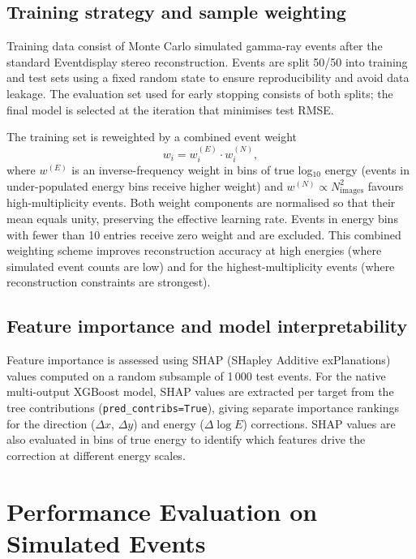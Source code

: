 \documentclass[12pt]{article}
\begin{document}
\subsection{Training strategy and sample weighting}
\label{sec:training}

Training data consist of Monte Carlo simulated gamma-ray events after the standard
Eventdisplay stereo reconstruction.
Events are split 50/50 into training and test sets using a fixed random state
to ensure reproducibility and avoid data leakage.
The evaluation set used for early stopping consists of both splits;
the final model is selected at the iteration that minimises test RMSE.

The training set is reweighted by a combined event weight
\begin{equation}
  w_i = w_i^{(E)} \cdot w_i^{(N)},
\end{equation}
where $w^{(E)}$ is an inverse-frequency weight in bins of true log$_{10}$ energy
(events in under-populated energy bins receive higher weight)
and $w^{(N)} \propto N_\mathrm{images}^2$ favours high-multiplicity events.
Both weight components are normalised so that their mean equals unity,
preserving the effective learning rate.
Events in energy bins with fewer than 10 entries receive zero weight and are excluded.
This combined weighting scheme improves reconstruction accuracy at high energies
(where simulated event counts are low) and for the highest-multiplicity events
(where reconstruction constraints are strongest).

\subsection{Feature importance and model interpretability}

Feature importance is assessed using SHAP (SHapley Additive exPlanations) values
computed on a random subsample of 1\,000 test events.
For the native multi-output XGBoost model, SHAP values are extracted per target
from the tree contributions (\texttt{pred\_contribs=True}),
giving separate importance rankings for the direction
($\Delta x$, $\Delta y$) and energy ($\Delta\log E$) corrections.
SHAP values are also evaluated in bins of true energy to identify
which features drive the correction at different energy scales.



\section{Performance Evaluation on Simulated Events}
\label{sec:performance}
\end{document}
